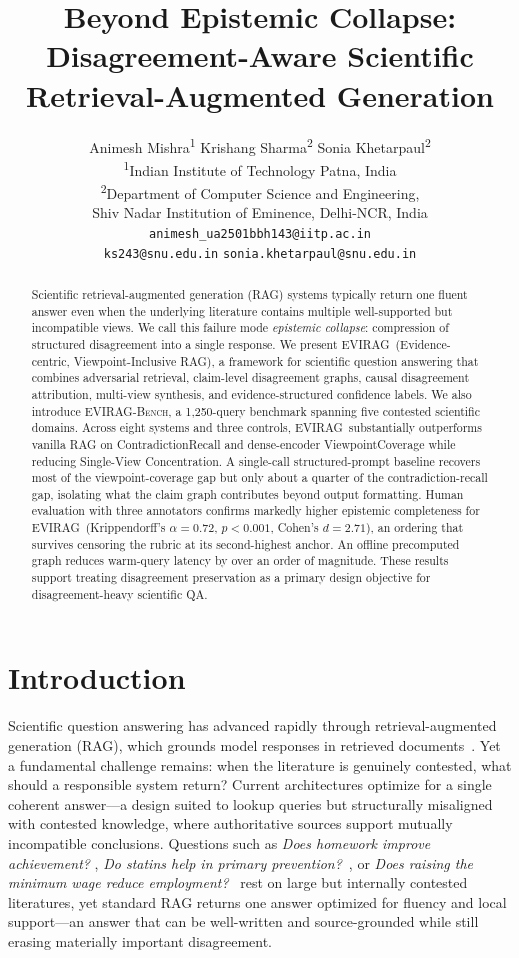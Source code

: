 \documentclass[11pt]{article}
\title{Beyond Epistemic Collapse: Disagreement-Aware Scientific\\
       Retrieval-Augmented Generation}
\author{
  Animesh Mishra\textsuperscript{1} \quad
  Krishang Sharma\textsuperscript{2} \quad
  Sonia Khetarpaul\textsuperscript{2} \\
  \textsuperscript{1}Indian Institute of Technology Patna, India \\
  \textsuperscript{2}Department of Computer Science and Engineering, \\
  Shiv Nadar Institution of Eminence, Delhi-NCR, India \\
  \texttt{animesh\_ua2501bbh143@iitp.ac.in} \\
  \texttt{ks243@snu.edu.in} \quad
  \texttt{sonia.khetarpaul@snu.edu.in}
}
\newcommand{\system}{\textsc{EVIRAG}\xspace}
\newcommand{\bench}{\textsc{EVIRAG-Bench}\xspace}
\begin{document}
\maketitle

\begin{abstract}
Scientific retrieval-augmented generation (RAG) systems typically return one
fluent answer even when the underlying literature contains multiple
well-supported but incompatible views.  We call this failure mode
\emph{epistemic collapse}: compression of structured disagreement into a single
response.  We present \system\ (Evidence-centric, Viewpoint-Inclusive RAG), a
framework for scientific question answering that combines adversarial retrieval,
claim-level disagreement graphs, causal disagreement attribution, multi-view
synthesis, and evidence-structured confidence labels.  We also introduce
\bench, a 1,250-query benchmark spanning five contested scientific domains.
Across eight systems and three controls, \system\ substantially outperforms
vanilla RAG on ContradictionRecall and dense-encoder ViewpointCoverage while
reducing Single-View Concentration.  A single-call structured-prompt baseline
recovers most of the viewpoint-coverage gap but only about a quarter of the
contradiction-recall gap, isolating what the claim graph contributes beyond
output formatting.  Human evaluation with three annotators confirms markedly
higher epistemic completeness for \system\ (Krippendorff's $\alpha{=}0.72$,
$p{<}0.001$, Cohen's $d{=}2.71$), an ordering that survives censoring the
rubric at its second-highest anchor.  An offline precomputed graph reduces
warm-query latency by over an order of magnitude.  These results support
treating disagreement preservation as a primary design objective for
disagreement-heavy scientific QA.
\end{abstract}

\section{Introduction}
\label{sec:intro}

Scientific question answering has advanced rapidly through retrieval-augmented
generation (RAG), which grounds model responses in retrieved
documents~\citep{lewis2020rag}.  Yet a fundamental challenge remains: when the
literature is genuinely contested, what should a responsible system return?
Current architectures optimize for a single coherent answer---a design suited
to lookup queries but structurally misaligned with contested knowledge, where
authoritative sources support mutually incompatible conclusions.  Questions
such as \textit{Does homework improve achievement?}
\citep{cooper2006homework,masalimova2023science,scheb2023hurt},
\textit{Do statins help in primary
prevention?}~\citep{ridker2008jupiter}, or \textit{Does raising the minimum
wage reduce employment?}~\citep{card1994minimum} rest on large but internally
contested literatures, yet standard RAG returns one answer optimized for
fluency and local support---an answer that can be well-written and
source-grounded while still erasing materially important disagreement.
\end{document}

